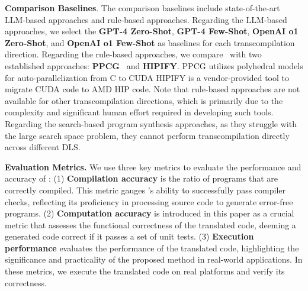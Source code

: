 \textbf{Comparison Baselines}.
The comparison baselines include state-of-the-art LLM-based approaches and rule-based approaches.
Regarding the LLM-based approaches, we select the \textbf{GPT-4 Zero-Shot}, \textbf{GPT-4 Few-Shot}, \textbf{OpenAI o1 Zero-Shot}, and \textbf{OpenAI o1 Few-Shot} as baselines for each transcompilation direction. 
Regarding the rule-based approaches, we compare \name~with two established approaches: \textbf{PPCG}~\cite{10.1145/2400682.2400713} and \textbf{HIPIFY}\cite{HIPIFY}.
PPCG utilizes polyhedral models for auto-parallelization from C to CUDA
HIPIFY is a vendor-provided tool to migrate CUDA code to AMD HIP code.
Note that rule-based approaches are not available for other transcompilation directions, which is primarily due to the complexity and significant human effort required in developing such tools.
Regarding the search-based program synthesis approaches, as they struggle with the large search space problem, they cannot perform transcompilation directly across different DLS. 


\textbf{Evaluation  Metrics.}
We use three key metrics to evaluate the performance and accuracy of \name{}:
(1) \textbf{Compilation accuracy} is the ratio of programs that are correctly compiled. This metric gauges \name{}'s ability to successfully pass compiler checks, reflecting its proficiency in processing source code to generate error-free programs.
(2) \textbf{Computation accuracy} is introduced in this paper as a crucial metric that assesses the functional correctness of the translated code, deeming a generated code correct if it passes a set of unit tests.
(3) \textbf{Execution performance} evaluates the performance of the translated code, highlighting the significance and practicality of the proposed method in real-world applications.
In these metrics, we execute the translated code on real platforms and verify its correctness.

